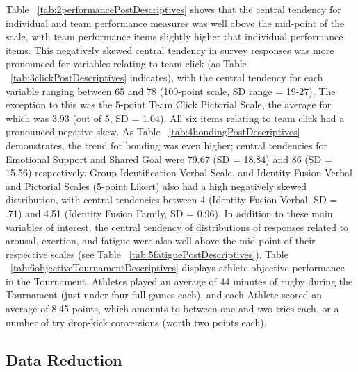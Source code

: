 \begin{CJK}{UTF8}{gbsn}


Table ~\ref{tab:2performancePostDescriptives} shows that the central tendency for individual and team performance measures was well above the mid-point of the scale, with team performance items slightly higher that individual performance items.  This negatively skewed central tendency in survey responses was more pronounced for variables relating to team click (as Table ~\ref{tab:3clickPostDescriptives} indicates), with the central tendency for each variable ranging between 65 and 78 (100-point scale, SD range = 19-27). The exception to this was the 5-point Team Click Pictorial Scale, the average for which was 3.93 (out of 5, SD = 1.04).  All six items relating to team click had a pronounced negative skew.  As Table ~\ref{tab:4bondingPostDescriptives} demonstrates, the trend for bonding was even higher; central tendencies for Emotional Support and Shared Goal were 79.67 (SD = 18.84) and 86 (SD = 15.56) respectively.  Group Identification Verbal Scale, and Identity Fusion Verbal and Pictorial Scales (5-point Likert) also had a high negatively skewed distribution, with central tendencies between 4 (Identity Fusion Verbal, SD = .71) and 4.51 (Identity Fusion Family, SD = 0.96).
In addition to these main variables of interest, the central tendency of distributions of responses related to arousal, exertion, and fatigue were also well above the mid-point of their respective scales (see Table ~\ref{tab:5fatiguePostDescriptives}).  Table ~\ref{tab:6objectiveTournamentDescriptives} displays athlete objective performance in the Tournament. Athletes played an average of 44 minutes of rugby during the Tournament (just under four full games each), and each Athlete scored an average of 8.45 points, which amounts to between one and two tries each, or a number of try drop-kick conversions (worth two points each).








\subsection{Data Reduction}






\end{CJK}
